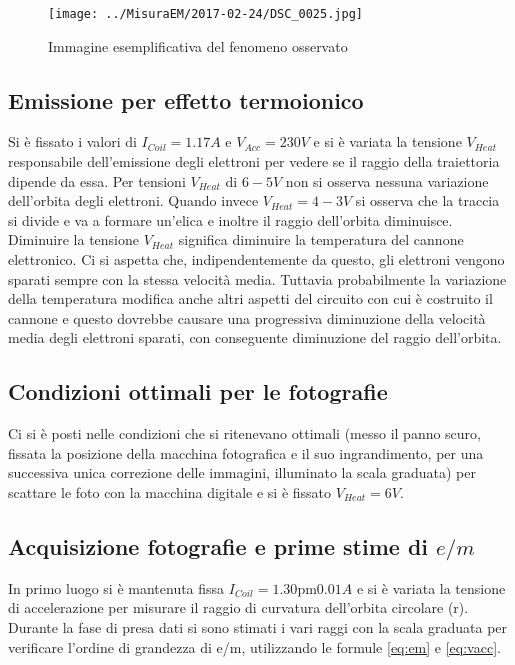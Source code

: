 \documentclass[10pt,a4paper]{article}
\begin{document}
\begin{figure}[H]
	\centering
	\texttt{[image: ../MisuraEM/2017-02-24/DSC\_0025.jpg]}
	\caption{Immagine esemplificativa del fenomeno osservato}
	\label{fig:ex1}
\end{figure}

\subsection{Emissione per effetto termoionico}

Si è fissato i valori di $I_{Coil} = \unit{1.17}{A}$ e $V_{Acc} = \unit{230}{V}$ e si è variata la tensione $V_{Heat}$ responsabile dell'emissione degli elettroni per vedere se il raggio della traiettoria dipende da essa.
Per tensioni $V_{Heat}$ di $\unit{6-5}{V}$ non si osserva nessuna variazione dell'orbita degli elettroni. Quando invece $V_{Heat} = \unit{4-3}{V}$ si osserva che la traccia si divide e va a formare un'elica e inoltre il raggio dell'orbita diminuisce. Diminuire la tensione $V_{Heat}$ significa diminuire la temperatura del cannone elettronico. Ci si aspetta che, indipendentemente da questo, gli elettroni vengono sparati sempre con la stessa velocità media. Tuttavia probabilmente la variazione della temperatura modifica anche altri aspetti del circuito con cui è costruito il cannone e questo dovrebbe causare una progressiva diminuzione della velocità media degli elettroni sparati, con conseguente diminuzione del raggio dell'orbita.


\subsection{Condizioni ottimali per le fotografie}

Ci si è posti nelle condizioni che si ritenevano ottimali (messo il panno scuro, fissata la posizione della macchina fotografica e il suo ingrandimento, per una successiva unica correzione delle immagini, illuminato la scala graduata) per scattare le foto con la macchina digitale e si è fissato $V_{Heat} = \unit{6}{V}$.


\subsection{Acquisizione fotografie e prime stime di $e/m$}

In primo luogo si è mantenuta fissa $I_{Coil} = \unit{1.30 \pm 0.01}{A}$ e si è variata la tensione di accelerazione per misurare il raggio di curvatura dell'orbita circolare (r). Durante la fase di presa dati si sono stimati i vari raggi con la scala graduata per verificare l'ordine di grandezza di e/m, utilizzando le formule \eqref{eq:em} e \eqref{eq:vacc}. 
\end{document}
